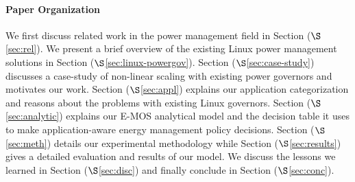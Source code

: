 \paragraph{Paper Organization} 
We first discuss related work in the power management field in Section ($\S$\ref{sec:rel}). 
We present a brief overview of the existing Linux power management solutions in Section ($\S$\ref{sec:linux-powergov}). 
Section ($\S$\ref{sec:case-study}) discusses a case-study of non-linear scaling with existing power governors and motivates our work.
Section ($\S$\ref{sec:appl}) explains our application categorization and reasons about the 
problems with existing Linux governors. 
Section ($\S$\ref{sec:analytic}) explains
our E-MOS analytical model and the decision table it uses to make application-aware energy management policy decisions. Section ($\S$\ref{sec:meth}) details our experimental methodology 
while Section ($\S$\ref{sec:results}) gives a detailed evaluation and results of our model. We discuss the
lessons we learned in Section ($\S$\ref{sec:disc}) and finally conclude in Section ($\S$\ref{sec:conc}).

